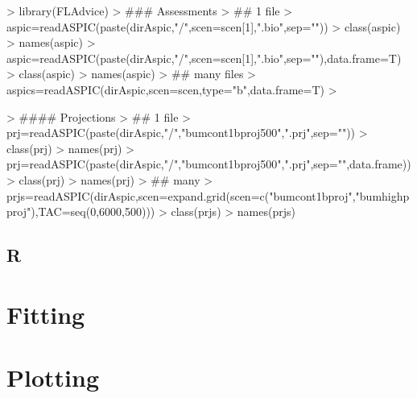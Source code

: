 \documentclass[shortnames,nojss,article]{jss}
\newenvironment{mylisting}
{\begin{list}{}{\setlength{\leftmargin}{1em}}\item\scriptsize\bfseries}
{\end{list}}
\begin{document}
\begin{mylisting}\begin{center}\begin{minipage}[H]{0.95\textwidth}\begin{shaded} 
\begin{Schunk}
\begin{Sinput}
> library(FLAdvice)
> ### Assessments
> ## 1 file
> aspic=readASPIC(paste(dirAspic,"/",scen=scen[1],".bio",sep=""))
> class(aspic)
> names(aspic)
> aspic=readASPIC(paste(dirAspic,"/",scen=scen[1],".bio",sep=""),data.frame=T)
> class(aspic)
> names(aspic)
> ## many files
> aspics=readASPIC(dirAspic,scen=scen,type="b",data.frame=T)
> 
\end{Sinput}
\end{Schunk}
\end{shaded}\end{minipage}\end{center}\end{mylisting}


\begin{mylisting}\begin{center}\begin{minipage}[H]{0.95\textwidth}\begin{shaded} 
\begin{Schunk}
\begin{Sinput}
> #### Projections
> ## 1 file
> prj=readASPIC(paste(dirAspic,"/","bumcont1bproj500",".prj",sep=""))
> class(prj)
> names(prj)
> prj=readASPIC(paste(dirAspic,"/","bumcont1bproj500",".prj",sep="",data.frame))
> class(prj)
> names(prj)
> ## many
> prjs=readASPIC(dirAspic,scen=expand.grid(scen=c("bumcont1bproj","bumhighpproj"),TAC=seq(0,6000,500)))
> class(prjs)
> names(prjs)
\end{Sinput}
\end{Schunk}
\end{shaded}\end{minipage}\end{center}\end{mylisting}

\subsection{R}

\section{Fitting}

\section{Plotting}
\end{document}

